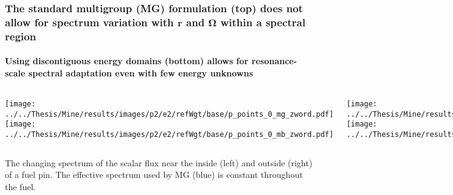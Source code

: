 \documentclass[compress,10pt]{beamer}
\renewcommand{\vec}[1]{\mathbf{#1}}
\newcommand{\om}{\boldsymbol{\Omega}}
\newlength \figwidth
\begin{document}
\begin{frame}
    \frametitle{The standard multigroup (MG) formulation (top) does not allow for spectrum variation with $\vec{r}$ and $\om$ within a spectral region}
    \framesubtitle{Using discontiguous energy domains (bottom) allows for resonance-scale spectral adaptation even with few energy unknowns}

\begin{columns}


   \setlength {}

   \centering
   {}\texttt{[image: ../../Thesis/Mine/results/images/p2/e2/refWgt/base/p\_points\_0\_mg\_zword.pdf]}\\
   {}\texttt{[image: ../../Thesis/Mine/results/images/p2/e2/refWgt/base/p\_points\_0\_mb\_zword.pdf]}\\


   \setlength {}

   \centering
   {}\texttt{[image: ../../Thesis/Mine/results/images/p2/e2/refWgt/base/p\_points\_2\_mg\_zword.pdf]}\\
   {}\texttt{[image: ../../Thesis/Mine/results/images/p2/e2/refWgt/base/p\_points\_2\_mb\_zword.pdf]}\\

   \end{columns}

{\footnotesize
The changing spectrum of the scalar flux near the inside (left) and outside (right) of a fuel pin. The effective spectrum used by MG ({\color{blue}blue}) is constant throughout the fuel.
}

\end{frame}

\typeout{***********************************************************************************}
\end{document}

